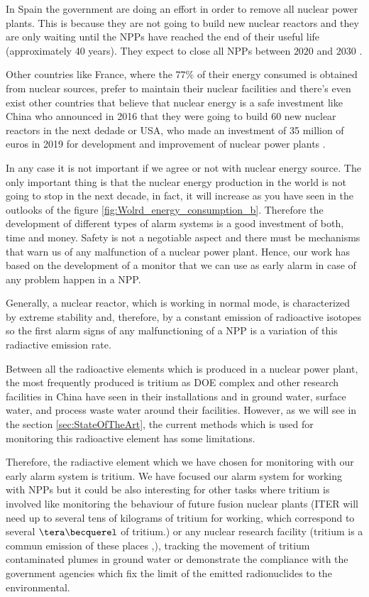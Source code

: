 In Spain the government are doing an effort in order to remove all nuclear power plants. This is because they are not going to build new nuclear reactors and they are only waiting until the NPPs have reached the end of their useful life (approximately 40 years). They expect to close all NPPs between $2020$ and $2030$ \cite{CloseNPP}. 

Other countries like France, where the $77\%$ of their energy consumed is obtained from nuclear sources, prefer to maintain their nuclear facilities and there's even exist other countries that believe that nuclear energy is a safe investment like China who announced in 2016 that they were going to build 60 new nuclear reactors in the next dedade \cite{60ReactorsChina} or USA, who made an investment of 35 million of euros in 2019 for development and improvement of nuclear power plants \cite{35MillionsUSA}. 

In any case it is not important if we agree or not with nuclear energy source. The only important thing is that the nuclear energy production in the world is not going to stop in the next decade, in fact, it will increase as you have seen in the outlooks of the figure \ref{fig:Wolrd_energy_consumption_b}. Therefore the development of  different types of alarm systems is a good investment of both, time and money. Safety is not a negotiable aspect and there must be mechanisms that warn us of any malfunction of a nuclear power plant. Hence, our work has based on the development of a monitor that we can use as early alarm in case of any problem happen in a NPP.

Generally, a nuclear reactor, which is working in normal mode, is characterized by extreme stability and, therefore, by a constant emission of radioactive isotopes so the first alarm signs of any malfunctioning of a NPP is a variation of this radiactive emission rate.

Between all the radioactive elements which is produced in a nuclear power plant, the most frequently produced is tritium as DOE complex \cite{FiberDetector1a} \cite{FiberDetector1b}  and other research facilities in China \cite{CommonEmissionTritium} have seen in their installations and in ground water, surface water, and process waste water around their facilities. However, as we will see in the section \ref{sec:StateOfTheArt}, the current methods which is used for monitoring this radioactive element has some limitations. 

Therefore, the radiactive element which we have chosen for monitoring with our early alarm system is tritium. We have focused our alarm system for working with NPPs but it could be also interesting for other tasks where tritium is involved like monitoring the behaviour of future fusion nuclear plants (ITER will need up to several tens of kilograms of tritium for working, which correspond to several $\tera\becquerel$ of tritium.) or any nuclear research facility (tritium is a commun emission of these places \cite{FERMILAB},\cite{BrookHavenNationalLaboratory}),  tracking the movement of tritium contaminated plumes in ground water \cite{TrackingTritium} or demonstrate the compliance with the government agencies which fix the limit of the emitted radionuclides to the environmental. 

